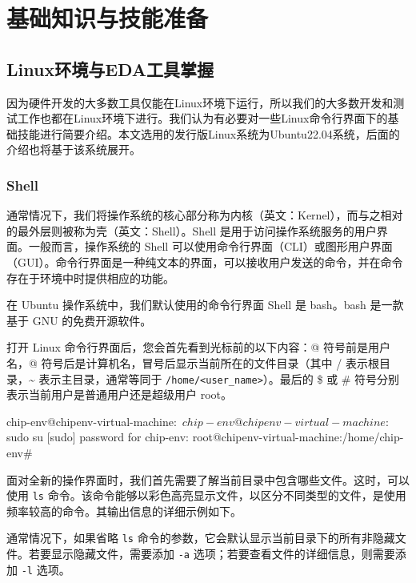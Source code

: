 \chapter{基础知识与技能准备}\label{chap:01-hardware-preparation}

\section{Linux环境与EDA工具掌握}\label{sec:01-hardware-preparation-001}

因为硬件开发的大多数工具仅能在Linux环境下运行，所以我们的大多数开发和测试工作也都在Linux环境下进行。我们认为有必要对一些Linux命令行界面下的基础技能进行简要介绍。本文选用的发行版Linux系统为Ubuntu22.04系统，后面的介绍也将基于该系统展开。

\subsection{Shell}\label{sec:01-hardware-preparation-002}

通常情况下，我们将操作系统的核心部分称为内核（英文：Kernel），而与之相对的最外层则被称为壳（英文：Shell）。Shell 是用于访问操作系统服务的用户界面。一般而言，操作系统的 Shell 可以使用命令行界面（CLI）或图形用户界面（GUI）。命令行界面是一种纯文本的界面，可以接收用户发送的命令，并在命令存在于环境中时提供相应的功能。

在 Ubuntu 操作系统中，我们默认使用的命令行界面 Shell 是 bash。bash 是一款基于 GNU 的免费开源软件。

打开 Linux 命令行界面后，您会首先看到光标前的以下内容：@ 符号前是用户名，@ 符号后是计算机名，冒号后显示当前所在的文件目录（其中 / 表示根目录，\textasciitilde{} 表示主目录，通常等同于 \texttt{/home/\textless{}user\_name\textgreater{}}）。最后的 \$ 或 \# 符号分别表示当前用户是普通用户还是超级用户 root。

\begin{CodeBlock}[language=BookShell]
chip-env@chipenv-virtual-machine:~$ 
chip-env@chipenv-virtual-machine:~$ sudo su
[sudo] password for chip-env: 
root@chipenv-virtual-machine:/home/chip-env# 
\end{CodeBlock}

面对全新的操作界面时，我们首先需要了解当前目录中包含哪些文件。这时，可以使用 \texttt{ls} 命令。该命令能够以彩色高亮显示文件，以区分不同类型的文件，是使用频率较高的命令。其输出信息的详细示例如下。

通常情况下，如果省略 \texttt{ls} 命令的参数，它会默认显示当前目录下的所有非隐藏文件。若要显示隐藏文件，需要添加 \texttt{-a} 选项；若要查看文件的详细信息，则需要添加 \texttt{-l} 选项。

